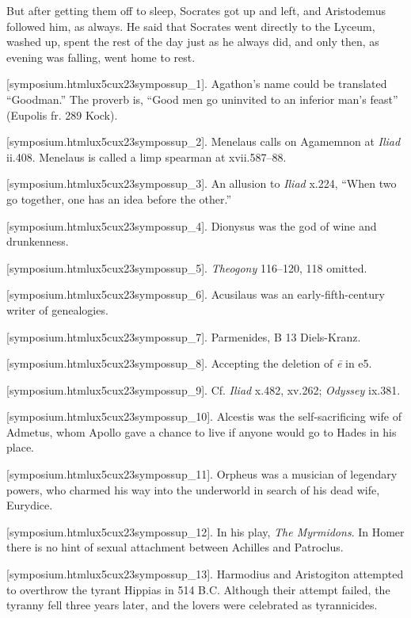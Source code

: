 But after getting them off to sleep, Socrates got up and left, and
Aristodemus followed him, as always. He said that Socrates went directly
to the Lyceum, washed up, spent the rest of the day just as he always
did, and only then, as evening was falling, went home to rest.\crlf
\crlf

[symposium.htmlux5cux23sympossup_1]. Agathon's name could be
translated “Goodman.” The proverb is, “Good men go uninvited to an
inferior man's feast” (Eupolis fr. 289 Kock).

[symposium.htmlux5cux23sympossup_2]. Menelaus calls on Agamemnon
at {\em Iliad} ii.408. Menelaus is called a limp spearman at
xvii.587--88.

[symposium.htmlux5cux23sympossup_3]. An allusion to {\em Iliad}
x.224, “When two go together, one has an idea before the other.”

[symposium.htmlux5cux23sympossup_4]. Dionysus was the god of
wine and drunkenness.

[symposium.htmlux5cux23sympossup_5]. {\em Theogony} 116--120,
118 omitted.

[symposium.htmlux5cux23sympossup_6]. Acusilaus was an
early-fifth-century writer of genealogies.

[symposium.htmlux5cux23sympossup_7]. Parmenides, B 13
Diels-Kranz.

[symposium.htmlux5cux23sympossup_8]. Accepting the deletion of
{\em ē} in e5.

[symposium.htmlux5cux23sympossup_9]. Cf. {\em Iliad} x.482,
xv.262; {\em Odyssey} ix.381.

[symposium.htmlux5cux23sympossup_10]. Alcestis was the
self-sacrificing wife of Admetus, whom Apollo gave a chance to live if
anyone would go to Hades in his place.

[symposium.htmlux5cux23sympossup_11]. Orpheus was a musician of
legendary powers, who charmed his way into the underworld in search of
his dead wife, Eurydice.

[symposium.htmlux5cux23sympossup_12]. In his play, {\em The
Myrmidons}. In Homer there is no hint of sexual attachment between
Achilles and Patroclus.

[symposium.htmlux5cux23sympossup_13]. Harmodius and Aristogiton
attempted to overthrow the tyrant Hippias in 514 B.C. Although their
attempt failed, the tyranny fell three years later, and the lovers were
celebrated as tyrannicides.

